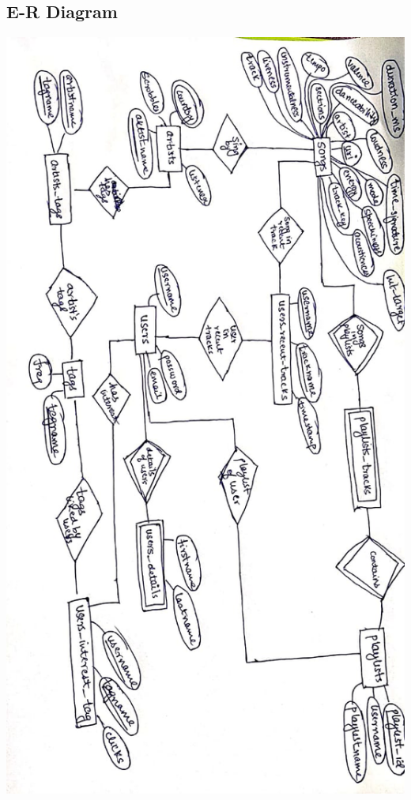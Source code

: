 \documentclass[10pt]{article}
\begin{document}
\subsection{E-R Diagram}
\begin{center}
    \includegraphics[width=\textwidth,height=\textheight,keepaspectratio]{ER_diagram.jpeg}
\end{center}
\end{document}
